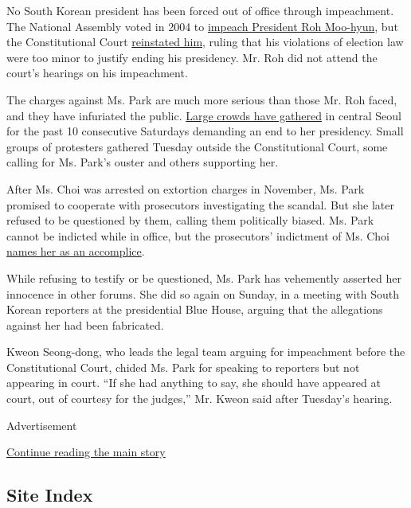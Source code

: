No South Korean president has been forced out of office through
impeachment. The National Assembly voted in 2004 to
\href{http://www.nytimes.com/2004/03/13/world/president-s-impeachment-stirs-angry-protests-in-south-korea.html}{impeach
President Roh Moo-hyun}, but the Constitutional Court
\href{http://www.nytimes.com/2004/05/14/world/constitutional-court-reinstates-south-korea-s-impeached-president.html}{reinstated
him}, ruling that his violations of election law were too minor to
justify ending his presidency. Mr. Roh did not attend the court's
hearings on his impeachment.

The charges against Ms. Park are much more serious than those Mr. Roh
faced, and they have infuriated the public.
\href{http://www.nytimes.com/2016/11/26/world/asia/korea-park-geun-hye-protests.html}{Large
crowds have gathered} in central Seoul for the past 10 consecutive
Saturdays demanding an end to her presidency. Small groups of protesters
gathered Tuesday outside the Constitutional Court, some calling for Ms.
Park's ouster and others supporting her.

After Ms. Choi was arrested on extortion charges in November, Ms. Park
promised to cooperate with prosecutors investigating the scandal. But
she later refused to be questioned by them, calling them politically
biased. Ms. Park cannot be indicted while in office, but the
prosecutors' indictment of Ms. Choi
\href{http://www.nytimes.com/2016/11/20/world/asia/park-geun-hye-south-korea-extortion-accomplice-prosecutors.html}{names
her as an accomplice}.

While refusing to testify or be questioned, Ms. Park has vehemently
asserted her innocence in other forums. She did so again on Sunday, in a
meeting with South Korean reporters at the presidential Blue House,
arguing that the allegations against her had been fabricated.

Kweon Seong-dong, who leads the legal team arguing for impeachment
before the Constitutional Court, chided Ms. Park for speaking to
reporters but not appearing in court. ``If she had anything to say, she
should have appeared at court, out of courtesy for the judges,'' Mr.
Kweon said after Tuesday's hearing.

Advertisement

\protect\hyperlink{after-bottom}{Continue reading the main story}

\hypertarget{site-index}{%
\subsection{Site Index}\label{site-index}}

